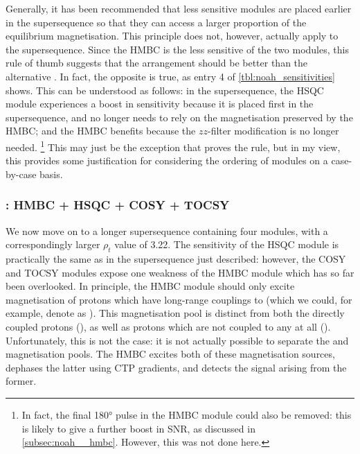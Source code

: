Generally, it has been recommended that less sensitive modules are placed earlier in the supersequence so that they can access a larger proportion of the equilibrium magnetisation.
This principle does not, however, actually apply to the  supersequence.
Since the HMBC is the less sensitive of the two modules, this rule of thumb suggests that the  arrangement should be better than the alternative .
In fact, the opposite is true, as entry 4 of \cref{tbl:noah_sensitivities} shows.
This can be understood as follows: in the  supersequence, the HSQC module experiences a boost in sensitivity because it is placed first in the supersequence, and no longer needs to rely on the  magnetisation preserved by the HMBC; and the HMBC benefits because the $zz$-filter modification is no longer needed.%
\footnote{In fact, the final \ang{180} pulse in the HMBC module could also be removed: this is likely to give a further boost in SNR, as discussed in \cref{subsec:noah__hmbc}. However, this was not done here.}
This may just be the exception that proves the rule, but in my view, this provides some justification for considering the ordering of modules on a case-by-case basis.

\subsubsection{: HMBC + HSQC + COSY + TOCSY}

We now move on to a longer supersequence containing four modules, with a correspondingly larger $\rho_t$ value of 3.22.
The sensitivity of the HSQC module is practically the same as in the  supersequence just described: however, the COSY and TOCSY modules expose one weakness of the HMBC module which has so far been overlooked.
In principle, the HMBC module should only excite magnetisation of protons which have long-range couplings to \carbon{} (which we could, for example, denote as ).
This magnetisation pool is distinct from both the directly coupled protons (), as well as protons which are not coupled to any \carbon{} at all ().
Unfortunately, this is not the case: it is not actually possible to separate the  and  magnetisation pools.
The HMBC excites both of these magnetisation sources, dephases the latter using CTP gradients, and detects the signal arising from the former.

